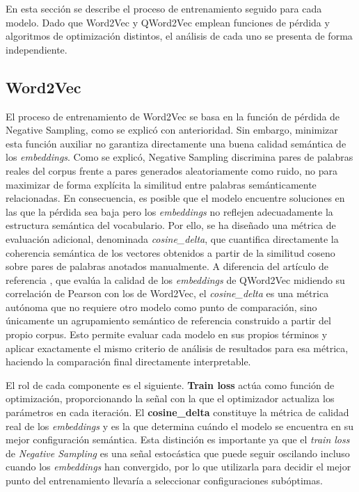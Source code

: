 En esta sección se describe el proceso de entrenamiento seguido para cada modelo. Dado que Word2Vec y QWord2Vec emplean funciones de pérdida y algoritmos de optimización distintos, el análisis de cada uno se presenta de forma independiente.

\subsection{Word2Vec}

El proceso de entrenamiento de Word2Vec se basa en la función de pérdida de Negative Sampling, como se explicó con anterioridad. Sin embargo, minimizar esta función auxiliar no garantiza directamente una buena calidad semántica de los \textit{embeddings}. Como se explicó, Negative Sampling discrimina pares de palabras reales del corpus frente a pares generados aleatoriamente como ruido, no para maximizar de forma explícita la similitud entre palabras semánticamente relacionadas. En consecuencia, es posible que el modelo encuentre soluciones en las que la pérdida sea baja pero los \textit{embeddings} no reflejen adecuadamente la estructura semántica del vocabulario. Por ello, se ha diseñado una métrica de evaluación adicional, denominada \textit{cosine\_delta}, que cuantifica directamente la coherencia semántica de los vectores obtenidos a partir de la similitud coseno sobre pares de palabras anotados manualmente. A diferencia del artículo de referencia \cite{ohno_qword2vec_2025}, que evalúa la calidad de los \textit{embeddings} de QWord2Vec midiendo su correlación de Pearson con los de Word2Vec, el \textit{cosine\_delta} es una métrica autónoma que no requiere otro modelo como punto de comparación, sino únicamente un agrupamiento semántico de referencia construido a partir del propio corpus. Esto permite evaluar cada modelo en sus propios términos y aplicar exactamente el mismo criterio de análisis de resultados para esa métrica, haciendo la comparación final directamente interpretable.

El rol de cada componente es el siguiente. \textbf{Train loss} actúa como función de optimización, proporcionando la señal con la que el optimizador actualiza los parámetros en cada iteración. El \textbf{cosine\_delta} constituye la métrica de calidad real de los \textit{embeddings} y es la que determina cuándo el modelo se encuentra en su mejor configuración semántica. Esta distinción es importante ya que el \textit{train loss} de \textit{Negative Sampling} es una señal estocástica que puede seguir oscilando incluso cuando los \textit{embeddings} han convergido, por lo que utilizarla para decidir el mejor punto del entrenamiento llevaría a seleccionar configuraciones subóptimas.

